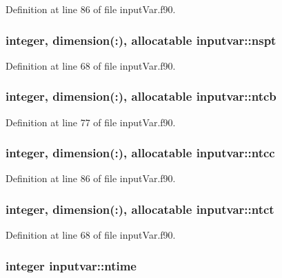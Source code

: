 Definition at line 86 of file input\-Var.\-f90.

\hypertarget{classinputvar_a0c86e9a7915872ee547e5bd8802611e7}{
\subsubsection[{nspt}]{\setlength{\rightskip}{0pt plus 5cm}integer, dimension(\-:), allocatable inputvar\-::nspt}}\label{classinputvar_a0c86e9a7915872ee547e5bd8802611e7}


Definition at line 68 of file input\-Var.\-f90.

\hypertarget{classinputvar_a41aaaf97cb1f1e815c73bcfa5f975be3}{
\subsubsection[{ntcb}]{\setlength{\rightskip}{0pt plus 5cm}integer, dimension(\-:), allocatable inputvar\-::ntcb}}\label{classinputvar_a41aaaf97cb1f1e815c73bcfa5f975be3}


Definition at line 77 of file input\-Var.\-f90.

\hypertarget{classinputvar_aaf3cc67ce289abacf61f20f5fdcfc3f6}{
\subsubsection[{ntcc}]{\setlength{\rightskip}{0pt plus 5cm}integer, dimension(\-:), allocatable inputvar\-::ntcc}}\label{classinputvar_aaf3cc67ce289abacf61f20f5fdcfc3f6}


Definition at line 86 of file input\-Var.\-f90.

\hypertarget{classinputvar_ad5c9bbca95851da9fa84642ea414e6be}{
\subsubsection[{ntct}]{\setlength{\rightskip}{0pt plus 5cm}integer, dimension(\-:), allocatable inputvar\-::ntct}}\label{classinputvar_ad5c9bbca95851da9fa84642ea414e6be}


Definition at line 68 of file input\-Var.\-f90.

\hypertarget{classinputvar_a30d8dd7bcf1952df019939f8ad23b6e2}{
\subsubsection[{ntime}]{\setlength{\rightskip}{0pt plus 5cm}integer inputvar\-::ntime}}\label{classinputvar_a30d8dd7bcf1952df019939f8ad23b6e2}


